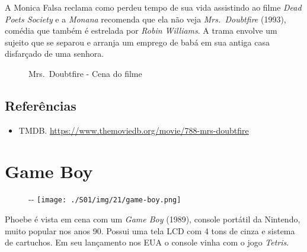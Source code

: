 A Monica Falsa reclama como perdeu tempo de sua vida assistindo ao filme
\emph{Dead Poets Society} e a \emph{Monana} recomenda que ela não veja
\emph{Mrs.~Doubtfire} (1993), comédia que também é estrelada por
\emph{Robin Williams}. A trama envolve um sujeito que se separou e
arranja um emprego de babá em sua antiga casa disfarçado de uma senhora.

\begin{figure}
  \centering
    \caption{Mrs. Doubtfire - Cena do filme\label{fig:mrs-doubtfire-cena-do-filme}}
\end{figure}

\hypertarget{referuxeancias-4}{%
\subsection{Referências}\label{referuxeancias-4}}

\begin{itemize}
\tightlist
\item
  \sloppy TMDB. \url{https://www.themoviedb.org/movie/788-mrs-doubtfire}
\end{itemize}

\hypertarget{game-boy}{%
\section{Game Boy}\label{game-boy}}

\begin{figure}[!ht]
  \begin{adjustwidth}{-\oddsidemargin-1in}{-\rightmargin}
    \centering
    \texttt{[image: ./S01/img/21/game-boy.png]}
  \end{adjustwidth}
\end{figure}

Phoebe é vista em cena com um \emph{Game Boy} (1989), console portátil
da Nintendo, muito popular nos anos 90. Possui uma tela LCD com 4 tons
de cinza e sistema de cartuchos. Em seu lançamento nos EUA o console
vinha com o jogo \emph{Tetris}.

